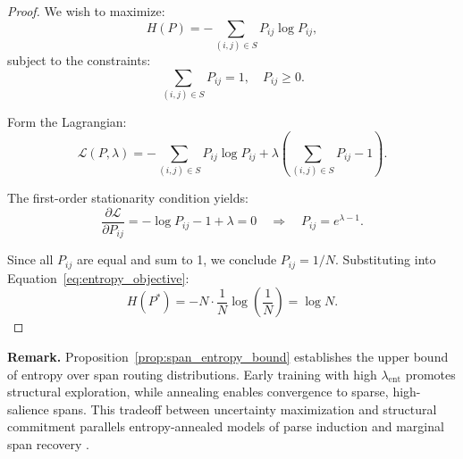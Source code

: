 \begin{proof}
We wish to maximize:
\begin{equation}
H(P) = -\sum_{(i,j)\in S} P_{ij} \log P_{ij},
\label{eq:entropy_objective}
\end{equation}
subject to the constraints:
\begin{equation}
\sum_{(i,j)\in S} P_{ij} = 1, \quad P_{ij} \geq 0.
\label{eq:prob_constraint}
\end{equation}

Form the Lagrangian:
\begin{equation}
\mathcal{L}(P, \lambda) = -\sum_{(i,j)\in S} P_{ij} \log P_{ij} + \lambda \left( \sum_{(i,j)\in S} P_{ij} - 1 \right).
\label{eq:lagrangian}
\end{equation}

The first-order stationarity condition yields:
\begin{equation}
\frac{\partial \mathcal{L}}{\partial P_{ij}} = -\log P_{ij} - 1 + \lambda = 0
\quad \Rightarrow \quad P_{ij} = e^{\lambda - 1}.
\label{eq:stationary_point}
\end{equation}

Since all \(P_{ij}\) are equal and sum to 1, we conclude \(P_{ij} = 1/N\). Substituting into Equation~\eqref{eq:entropy_objective}:
\begin{equation}
H(P^*) = -N \cdot \frac{1}{N} \log \left( \frac{1}{N} \right) = \log N.
\label{eq:entropy_substitution}
\end{equation}
\end{proof}

\noindent\textbf{Remark.}
Proposition~\ref{prop:span_entropy_bound} establishes the upper bound of entropy over span routing distributions. Early training with high \(\lambda_{\mathrm{ent}}\) promotes structural exploration, while annealing enables convergence to sparse, high-salience spans. This tradeoff between uncertainty maximization and structural commitment parallels entropy-annealed models of parse induction \cite{kim2019unsupervised} and marginal span recovery \cite{clark2018semi}.


